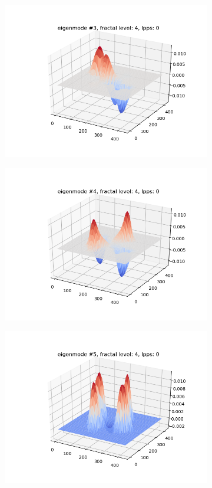 \documentclass{article}
\begin{document}
\begin{figure}
\begin{subfigure}{0.3\textwidth}
        \includegraphics[width=\linewidth]{../figs/eigenmode_3d3.png}
    \end{subfigure}
    \begin{subfigure}{0.3\textwidth}
        \includegraphics[width=\linewidth]{../figs/eigenmode_3d4.png}
    \end{subfigure}
    \begin{subfigure}{0.3\textwidth}
        \includegraphics[width=\linewidth]{../figs/eigenmode_3d5.png}

\end{subfigure}
\end{figure}
\end{document}
